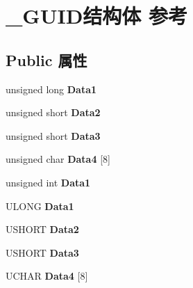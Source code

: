 \hypertarget{struct___g_u_i_d}{}\section{\+\_\+\+G\+U\+I\+D结构体 参考}
\label{struct___g_u_i_d}
\subsection*{Public 属性}
\begin{DoxyCompactItemize}
\item 
\mbox{\label{struct___g_u_i_d_a361004d1e9818d28fd8abb71d72c5373}} 
unsigned long {\bfseries Data1}
\item 
\mbox{\label{struct___g_u_i_d_ac0ad0a061c9fab316d495ab2a6a5906d}} 
unsigned short {\bfseries Data2}
\item 
\mbox{\label{struct___g_u_i_d_ae6ba08acc6fcc433c0b47fbc5270cdaf}} 
unsigned short {\bfseries Data3}
\item 
\mbox{\label{struct___g_u_i_d_a1710e2b29c705b6c559a572a2585eb7b}} 
unsigned char {\bfseries Data4} \mbox{[}8\mbox{]}
\item 
\mbox{\label{struct___g_u_i_d_ab5f1ae31d5ac3fc09535efd5c34320d3}} 
unsigned int {\bfseries Data1}
\item 
\mbox{\label{struct___g_u_i_d_aa8a03f06ed2af52a5aadeac367ffafea}} 
U\+L\+O\+NG {\bfseries Data1}
\item 
\mbox{\label{struct___g_u_i_d_aa9eb86ef3c0b45d892d249f94eb91c7e}} 
U\+S\+H\+O\+RT {\bfseries Data2}
\item 
\mbox{\label{struct___g_u_i_d_a763787bcc60573c8d61bb4db4ba98a10}} 
U\+S\+H\+O\+RT {\bfseries Data3}
\item 
\mbox{\label{struct___g_u_i_d_a0e03da88811af4c8d8044b7135e2709f}} 
U\+C\+H\+AR {\bfseries Data4} \mbox{[}8\mbox{]}
\item 
\mbox{\label{struct___g_u_i_d_ab5257063220cb299cd5992929d4e506b}} 

\end{DoxyCompactItemize}
